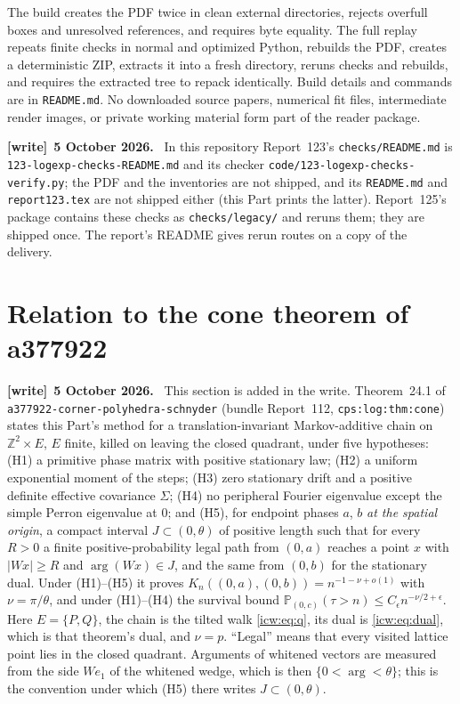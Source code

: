 \documentclass[11pt,letterpaper]{article}
\theoremstyle{remark}\newtheorem{remark}[theorem]{Remark}
\newcommand{\ZZ}{\mathbb Z}
\newcommand{\Prob}{\mathbb P}
\newcommand{\1}{\mathbf1}
\newenvironment{writenote}[1][]{\par\smallskip\begingroup\small
 \noindent\textbf{[write]}\if\relax\detokenize{#1}\relax\else~\textbf{#1.}\fi\ }%
 {\par\endgroup\smallskip}
\newcommand{\file}[1]{\textup{\nolinkurl{#1}}}
\begin{document}
The build creates the PDF twice in clean external directories, rejects
overfull boxes and unresolved references, and requires byte equality.
The full replay repeats finite checks in normal and optimized Python,
rebuilds the PDF, creates a deterministic ZIP, extracts it into a fresh
directory, reruns checks and rebuilds, and requires the extracted tree to
repack identically. Build details and commands are in \texttt{README.md}.
No downloaded source papers, numerical fit files, intermediate render
images, or private working material form part of the reader package.
\begin{writenote}[5 October 2026]
In this repository Report~123's \file{checks/README.md} is \file{123-logexp-checks-README.md} and its checker \file{code/123-logexp-checks-verify.py}; the PDF and the inventories are not shipped, and its \file{README.md} and \file{report123.tex} are not shipped either (this Part prints the latter). Report~125's package contains these checks as \file{checks/legacy/} and reruns them; they are shipped once. The report's README gives rerun routes on a copy of the delivery.
\end{writenote}

\section{Relation to the cone theorem of a377922}\label{icw:log:sec:cone}
\begin{writenote}[5 October 2026]
This section is added in the write. Theorem~24.1 of \file{a377922-corner-polyhedra-schnyder} (bundle Report~112, \texttt{cps:log:thm:cone}) states this Part's method for a translation-invariant Markov-additive chain on $\ZZ^2\times E$, $E$ finite, killed on leaving the closed quadrant, under five hypotheses: (H1) a primitive phase matrix with positive stationary law; (H2) a uniform exponential moment of the steps; (H3) zero stationary drift and a positive definite effective covariance $\Sigma$; (H4) no peripheral Fourier eigenvalue except the simple Perron eigenvalue at $0$; and (H5), for endpoint phases $a$, $b$ \emph{at the spatial origin}, a compact interval $J\subset(0,\theta)$ of positive length such that for every $R>0$ a finite positive-probability legal path from $(0,a)$ reaches a point $x$ with $|Wx|\ge R$ and $\arg(Wx)\in J$, and the same from $(0,b)$ for the stationary dual. Under (H1)--(H5) it proves $K_n((0,a),(0,b))=n^{-1-\nu+o(1)}$ with $\nu=\pi/\theta$, and under (H1)--(H4) the survival bound $\Prob_{(0,c)}(\tau>n)\le C_\epsilon n^{-\nu/2+\epsilon}$. Here $E=\{P,Q\}$, the chain is the tilted walk \eqref{icw:eq:q}, its dual is \eqref{icw:eq:dual}, which is that theorem's dual, and $\nu=p$. ``Legal'' means that every visited lattice point lies in the closed quadrant. Arguments of whitened vectors are measured from the side $We_1$ of the whitened wedge, which is then $\{0<\arg<\theta\}$; this is the convention under which (H5) there writes $J\subset(0,\theta)$.
\end{writenote}
\end{document}
